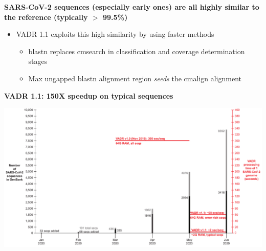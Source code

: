 \documentclass[landscape]{slides}
\begin{document}
\begin{slide}
\begin{center}
\textbf{SARS-CoV-2 sequences (especially early ones) are all highly
  similar to the reference (typically $>$ 99.5\%)}
\end{center}

\begin{itemize}
\item VADR 1.1 exploits this high similarity by using faster methods
  \begin{itemize}
  \item blastn replaces cmsearch in classification and coverage determination stages
  \item Max ungapped blastn alignment region \emph{seeds} the cmalign alignment
  \end{itemize}
\end{itemize}

\vfill
\end{slide}
\begin{slide}
\begin{center}
\textbf{VADR 1.1: 150X speedup on typical sequences}

\includegraphics[width=10.5in]{figs/sars-counts-jan2020-may2020-slide3}
\end{center}

\vfill
\end{slide}
\end{document}

